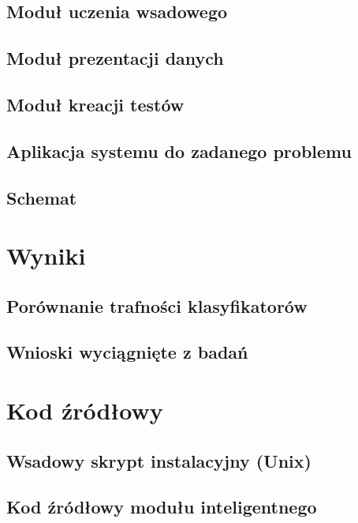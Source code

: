 \documentclass[12pt,a4paper,oneside]{report} %
\begin{document}
\section{Moduł uczenia wsadowego}
\section{Moduł prezentacji danych}
\section{Moduł kreacji testów}
\section{Aplikacja systemu do zadanego problemu}
\section{Schemat}
\chapter{Wyniki}
\section{Porównanie trafności klasyfikatorów}
\section{Wnioski wyciągnięte z badań}
\chapter{Kod źródłowy}
\section{Wsadowy skrypt instalacyjny (Unix)}
\section{Kod źródłowy modułu inteligentnego}

\end{document}
